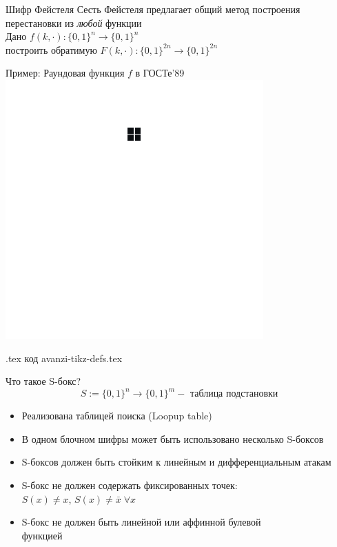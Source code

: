 \documentclass[usenames,dvipsnames,8pt,aspectratio=169]{beamer}
\begin{document}
\begin{frame}{Шифр Фейстеля}
\Large
	\vspace{-90pt}
	Сесть Фейстеля предлагает общий метод построения перестановки из \emph{любой} функции\\[10pt]
	Дано \hspace{40pt} $f(k, \cdot): \{0,1\}^n \rightarrow \{0,1\}^n$ \\[7pt]
	построить обратимую $F(k, \cdot):\{0,1\}^{2n} \rightarrow \{0,1\}^{2n}$ \\

%
%	
\end{frame}


\begin{frame}{Пример: Раундовая функция $f$ в ГОСТе'89}
\centering
{}
\includegraphics[height=0.83\textheight]{GostRound}

\vfill
\small
{\color{gray} {.tex код avanzi-tikz-defs.tex }} 
\end{frame}

\begin{frame}{Что такое S-бокс?}
	\LARGE
	\[
		S:= \{0,1\}^n \rightarrow \{0,1\}^m - \text{ таблица подстановки}
	\]

	\begin{itemize}
		\item Реализована таблицей поиска (Loopup table)
		\item В одном блочном шифры может быть использовано несколько S-боксов
		\item S-боксов должен быть стойким к  линейным и дифференциальным атакам
		\item S-бокс не должен содержать фиксированных точек: \\ $S(x) \neq x $, $S(x) \neq  \bar{x} \; \forall x$
		\item S-бокс не должен быть линейной или аффинной булевой \\ функцией
	\end{itemize}
\end{frame}
\end{document}
